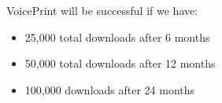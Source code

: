 VoicePrint will be successful if we have:
\begin{itemize}
\end{itemize}
\begin{itemize}
\item 25,000 total downloads after 6 months
\item 50,000 total downloads after 12 months
\item 100,000 downloads after 24 months
\end{itemize}

